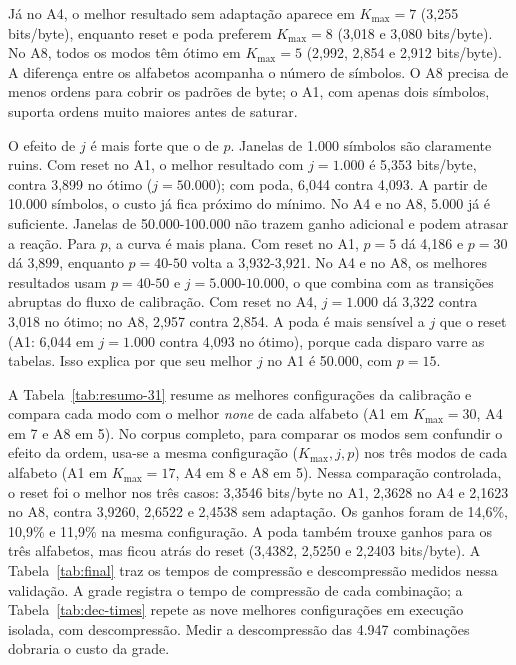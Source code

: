 \documentclass[12pt,a4paper]{article}
\begin{document}
J\'a no A4, o melhor resultado sem adapta\c{c}\~ao aparece em $K_{\max}=7$ (3,255
bits/byte), enquanto reset e poda preferem $K_{\max}=8$ (3,018 e 3,080 bits/byte).
No A8, todos os modos t\^em \'otimo em $K_{\max}=5$ (2,992, 2,854 e 2,912
bits/byte). A diferen\c{c}a entre os alfabetos acompanha o n\'umero de s\'imbolos.
O A8 precisa de menos ordens para cobrir os padr\~oes de byte; o A1, com apenas
dois s\'imbolos, suporta ordens muito maiores antes de saturar.

O efeito de $j$ \'e mais forte que o de $p$. Janelas de 1.000 s\'imbolos s\~ao
claramente ruins. Com reset no A1, o melhor resultado com $j=1.000$ \'e 5,353
bits/byte, contra 3,899 no \'otimo ($j=50.000$); com poda, 6,044 contra 4,093. A
partir de 10.000 s\'imbolos, o custo j\'a fica pr\'oximo do m\'inimo. No A4 e no
A8, 5.000 j\'a \'e suficiente. Janelas de 50.000-100.000 n\~ao trazem ganho
adicional e podem atrasar a rea\c{c}\~ao.
Para $p$, a curva \'e mais plana. Com reset no A1, $p=5$ d\'a 4,186 e $p=30$ d\'a
3,899, enquanto $p=40$-$50$ volta a 3,932-3,921. No A4 e no A8, os melhores
resultados usam $p=40$-$50$ e $j=5.000$-$10.000$, o que combina com as
transi\c{c}\~oes abruptas do fluxo de calibra\c{c}\~ao. Com reset no A4, $j=1.000$
d\'a 3,322 contra 3,018 no \'otimo; no A8, 2,957 contra 2,854. A poda \'e mais
sens\'ivel a $j$ que o reset (A1: 6,044 em $j=1.000$ contra 4,093 no \'otimo),
porque cada disparo varre as tabelas. Isso explica por que seu melhor $j$ no A1 \'e 50.000,
com $p=15$.

A Tabela~\ref{tab:resumo-31} resume as melhores configura\c{c}\~oes da
calibra\c{c}\~ao e compara cada modo com o melhor \emph{none} de cada alfabeto (A1
em $K_{\max}=30$, A4 em 7 e A8 em 5). No corpus completo, para comparar os modos
sem confundir o efeito da ordem, usa-se a mesma configura\c{c}\~ao
($K_{\max},j,p$) nos tr\^es modos de cada alfabeto (A1 em $K_{\max}=17$, A4 em 8 e
A8 em 5). Nessa compara\c{c}\~ao controlada, o reset foi o melhor nos tr\^es
casos: 3,3546 bits/byte no A1, 2,3628 no A4 e 2,1623 no A8, contra 3,9260, 2,6522
e 2,4538 sem adapta\c{c}\~ao. Os ganhos foram de 14,6\%, 10,9\% e 11,9\% na mesma
configura\c{c}\~ao. A poda tamb\'em trouxe ganhos para os tr\^es alfabetos, mas ficou atr\'as
do reset (3,4382, 2,5250 e 2,2403 bits/byte). A Tabela~\ref{tab:final} traz os
tempos de compress\~ao e descompress\~ao medidos nessa valida\c{c}\~ao. A grade
registra o tempo de compress\~ao de cada combina\c{c}\~ao; a
Tabela~\ref{tab:dec-times} repete as nove melhores configura\c{c}\~oes em
execu\c{c}\~ao isolada, com descompress\~ao. Medir a descompress\~ao das 4.947
combina\c{c}\~oes dobraria o custo da grade.
\end{document}
